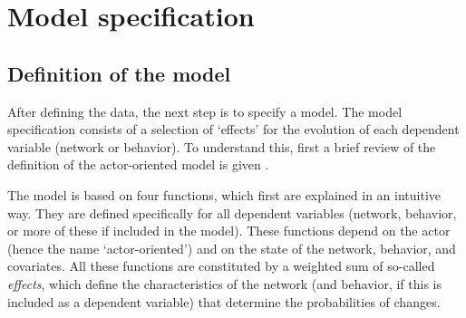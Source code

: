 \documentclass[a4paper,fleqn,11pt]{article}
\newcommand{\+}{\, + \,}
\begin{document}
\newpage
\section{Model specification}
\label{S_modspec}

\subsection{Definition of the model}
\label{S_defmod}

After defining the data, the next step is to specify a model.
The model specification consists of a selection of `effects'
for the evolution of each dependent variable (network or behavior).
To understand this, first a brief review of the definition of the
actor-oriented model is given
\citep*[for further explanations see][]{Snijders01, Snijders05,
SnijdersEA07, SnijdersEA10b}.

The model is based on four functions, which first are explained in an
intuitive way.
They are defined specifically for all dependent variables (network, behavior,
or more of these if included in the model).
These functions depend on the actor (hence the name `actor-oriented')
and on the state of the network, behavior, and covariates.
All these functions are constituted by a weighted sum
of so-called \emph{effects}, which define the characteristics of
the network (and behavior, if this is included as a dependent variable)
that determine the probabilities of changes.
\end{document}
